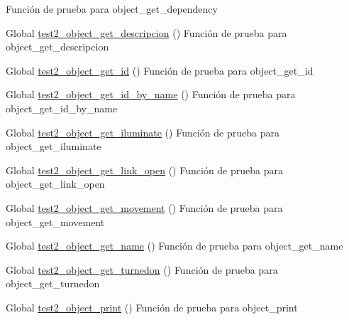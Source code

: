 \begin{DoxyRefList}
%
Función de prueba para object\+\_\+get\+\_\+dependency  
\item[Global \mbox{\hyperlink{object__test_8c_ac4fd76698e8cc8b06f674250e29af269}{test2\+\_\+object\+\_\+get\+\_\+descripcion}} ()]\label{test__test000144}%
%
Función de prueba para object\+\_\+get\+\_\+descripcion  
\item[Global \mbox{\hyperlink{object__test_8c_a1ff250f0f43297f57fcce1f3a6ae490b}{test2\+\_\+object\+\_\+get\+\_\+id}} ()]\label{test__test000135}%
%
Función de prueba para object\+\_\+get\+\_\+id  
\item[Global \mbox{\hyperlink{object__test_8c_a6459e97f42e94dd903c5d96c7d957bcb}{test2\+\_\+object\+\_\+get\+\_\+id\+\_\+by\+\_\+name}} ()]\label{test__test000149}%
%
Función de prueba para object\+\_\+get\+\_\+id\+\_\+by\+\_\+name  
\item[Global \mbox{\hyperlink{object__test_8c_a87e22dc68b0458111e9573c071aac732}{test2\+\_\+object\+\_\+get\+\_\+iluminate}} ()]\label{test__test000158}%
%
Función de prueba para object\+\_\+get\+\_\+iluminate  
\item[Global \mbox{\hyperlink{object__test_8c_a4843cbb15381ca8d9a697aa0785e6be6}{test2\+\_\+object\+\_\+get\+\_\+link\+\_\+open}} ()]\label{test__test000172}%
%
Función de prueba para object\+\_\+get\+\_\+link\+\_\+open  
\item[Global \mbox{\hyperlink{object__test_8c_af6720a5933b63c6a467cc63d146c7818}{test2\+\_\+object\+\_\+get\+\_\+movement}} ()]\label{test__test000154}%
%
Función de prueba para object\+\_\+get\+\_\+movement  
\item[Global \mbox{\hyperlink{object__test_8c_abdfafbc7b8588d3dcdb05fd2beb2397e}{test2\+\_\+object\+\_\+get\+\_\+name}} ()]\label{test__test000142}%
%
Función de prueba para object\+\_\+get\+\_\+name  
\item[Global \mbox{\hyperlink{object__test_8c_ace5d21b09295b68aacc8d419ec689bf7}{test2\+\_\+object\+\_\+get\+\_\+turnedon}} ()]\label{test__test000162}%
%
Función de prueba para object\+\_\+get\+\_\+turnedon  
\item[Global \mbox{\hyperlink{object__test_8c_a57499e0ae8248f1182072920b47add5e}{test2\+\_\+object\+\_\+print}} ()]\label{test__test000152}%
%
Función de prueba para object\+\_\+print  

\end{DoxyRefList}
